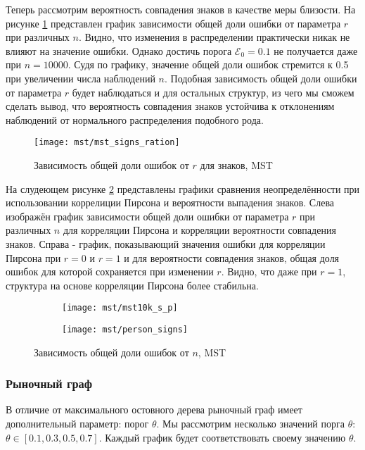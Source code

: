 Теперь рассмотрим вероятность совпадения знаков в качестве меры близости. На рисунке \ref{fig:exp/mst/mst_signs_ration} представлен график зависимости общей доли ошибки от параметра $r$ при различных $n$. Видно, что изменения в распределении практически никак не влияют на значение ошибки. Однако  достичь порога $\mathcal{E}_0=0.1$ не получается даже при  $n=10000$. Судя по графику, значение общей доли ошибок стремится к 0.5 при увеличении числа наблюдений $n$. Подобная зависимость общей доли ошибки от параметра $r$ будет наблюдаться и для остальных структур, из чего мы сможем сделать вывод, что вероятность совпадения знаков устойчива к отклонениям наблюдений от нормального распределения подобного рода.

\begin{figure}[H]
\centering
\texttt{[image: mst/mst\_signs\_ration]}
\caption{Зависимость общей доли ошибок от $r$ для знаков, MST}
\label{fig:exp/mst/mst_signs_ration}
\end{figure}

На слудеющем рисунке \ref{fig:exp/mst/pearson_signs} представлены графики сравнения неопределённости при использовании коррелиции Пирсона и вероятности выпадения знаков. Слева изображён график зависимости общей доли ошибки от параметра $r$ при различных $n$ для корреляции Пирсона и корреляции вероятности совпадения знаков. Справа - график, показывающий значения ошибки для корреляции Пирсона при $r=0$ и $r=1$ и для вероятности совпадения знаков, общая доля ошибок для которой сохраняется при изменении $r$. Видно, что даже при $r=1$, структура на основе корреляции Пирсона более стабильна.

\begin{figure}[H]
     \centering
     \begin{subfigure}[b]{0.49\textwidth}
         \centering
         \texttt{[image: mst/mst10k\_s\_p]}
     \end{subfigure}
     \hfill
     \begin{subfigure}[b]{0.49\textwidth}
         \centering
         \texttt{[image: mst/person\_signs]}
     \end{subfigure}
     

        \caption{Зависимость общей доли ошибок от $n$, MST}
        \label{fig:exp/mst/pearson_signs}
\end{figure}  


\subsubsection{Рыночный граф}
В отличие от максимального остовного дерева рыночный граф имеет дополнительный параметр: порог $\theta$. Мы рассмотрим несколько значений порга $\theta$: $\theta \in [0.1, 0.3, 0.5, 0.7]$. Каждый график будет соответствовать своему значению $\theta$.

